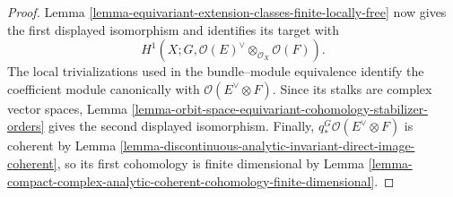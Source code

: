 \begin{proof}
Lemma \ref{lemma-equivariant-extension-classes-finite-locally-free} now gives
the first displayed isomorphism and identifies its target with
$$
H^1\left(X;G,
\mathcal O(E)^\vee\otimes_{\mathcal O_X}\mathcal O(F)\right).
$$
The local trivializations used in the bundle--module equivalence identify the
coefficient module canonically with $\mathcal O(E^\vee\otimes F)$. Since its
stalks are complex vector spaces, Lemma
\ref{lemma-orbit-space-equivariant-cohomology-stabilizer-orders} gives the
second displayed isomorphism. Finally,
$q_*^G\mathcal O(E^\vee\otimes F)$ is coherent by Lemma
\ref{lemma-discontinuous-analytic-invariant-direct-image-coherent}, so its
first cohomology is finite dimensional by Lemma
\ref{lemma-compact-complex-analytic-coherent-cohomology-finite-dimensional}.
\end{proof}

